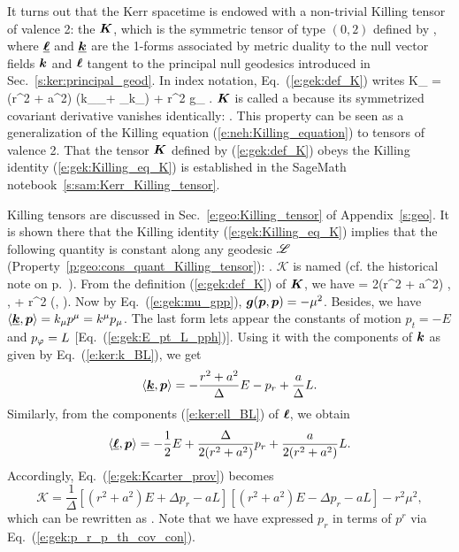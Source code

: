 It turns out that the Kerr spacetime is endowed with a non-trivial
Killing tensor of valence 2: the
 $\bm{K}$, which is the symmetric tensor of type
$(0,2)$ defined by
\be \label{e:gek:def_K}
     ,
\ee
where $\underline{\bm{\ell}}$ and $\underline{\bm{k}}$ are the 1-forms associated by metric duality
to the null vector fields $\bm{k}$ and $\bm{\ell}$ tangent to the principal null
geodesics introduced in Sec.~\ref{s:ker:principal_geod}. In index notation,
Eq.~(\ref{e:gek:def_K}) writes
\be
    K_{\alpha\beta} = (r^2 + a^2) \left(k_\alpha \el_\beta + \el_\alpha k_\beta \right)
        + r^2 g_{\alpha\beta} .
\ee
$\bm{K}$ is called a  because its symmetrized covariant derivative vanishes identically:
\be \label{e:gek:Killing_eq_K}
    .
\ee
This property can be seen as a generalization of the Killing equation
(\ref{e:neh:Killing_equation}) to tensors of valence 2.
That the tensor $\bm{K}$ defined by (\ref{e:gek:def_K}) obeys the Killing
identity (\ref{e:gek:Killing_eq_K}) is established in the
SageMath notebook~\ref{s:sam:Kerr_Killing_tensor}.

Killing tensors are discussed in Sec.~\ref{e:geo:Killing_tensor} of Appendix~\ref{s:geo}.
It is shown there that the Killing identity (\ref{e:gek:Killing_eq_K}) implies that
the following quantity is constant along any geodesic $\mathscr{L}$
(Property~\ref{p:geo:cons_quant_Killing_tensor}):
\be
     .
\ee
$\mathscr{K}$ is named 
(cf. the historical note on p.~\pageref{h:gek:eom_Carter}).
From the definition (\ref{e:gek:def_K}) of $\bm{K}$, we have
\be \label{e:gek:Kcarter_prov}
     = 2(r^2 + a^2) \langle {},  \rangle
        \langle \uu{\el},  \rangle + r^2 (, ).
\ee
Now by Eq.~(\ref{e:gek:mu_gpp}), $\bm{g}(\bm{p}, \bm{p}) = - \mu^2$. Besides, we
have $\langle \underline{\bm{k}}, \bm{p} \rangle = k_\mu p^\mu = k^\mu p_\mu$.
The last form lets appear the constants of motion $p_t = -E$ and
$p_\varphi = L$ [Eq.~(\ref{e:gek:E_pt_L_pph})]. Using it with the components
of $\bm{k}$ as given by Eq.~(\ref{e:ker:k_BL}), we get
\[
    \langle \underline{\bm{k}}, \bm{p} \rangle = - \frac{r^2 + a^2}{\Delta} E
    - p_r + \frac{a}{\Delta} L .
\]
Similarly, from the components (\ref{e:ker:ell_BL}) of $\bm{\ell}$, we obtain
\[
     \langle \underline{\bm{\ell}}, \bm{p} \rangle = - \frac{1}{2} E + \frac{\Delta}{2(r^2 + a^2)} p_r
     + \frac{a}{2(r^2 + a^2)} L .
\]
Accordingly, Eq.~(\ref{e:gek:Kcarter_prov}) becomes
\[
    \mathscr{K} = \frac{1}{\Delta} \left[ (r^2 + a^2) E + \Delta p_r - a L \right]
      \left[ (r^2 + a^2) E - \Delta p_r - a L \right] - r^2 \mu^2 ,
\]
which can be rewritten as
\be \label{e:gek:Kcarter_first_int}
   .
\ee
Note that we have expressed $p_r$ in terms of $p^r$ via Eq.~(\ref{e:gek:p_r_p_th_cov_con}).

